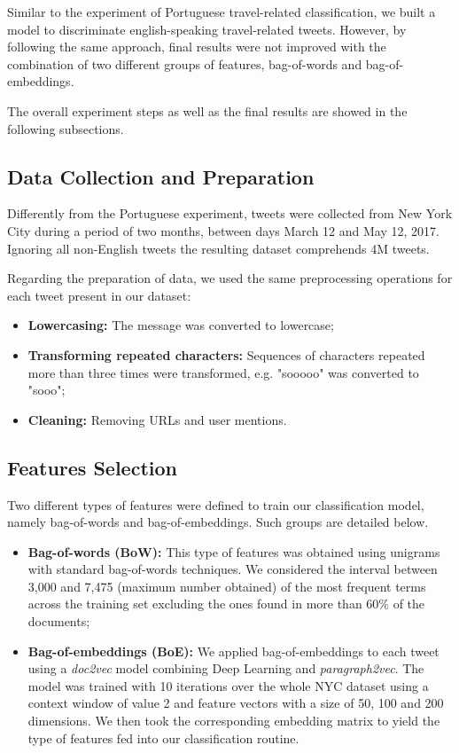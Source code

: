 Similar to the experiment of Portuguese travel-related classification, we built a model to discriminate english-speaking travel-related tweets. However, by following the same approach, final results were not improved with the combination of two different groups of features, bag-of-words and bag-of-embeddings.

The overall experiment steps as well as the final results are showed in the following subsections.

\subsection{Data Collection and Preparation}
Differently from the Portuguese experiment, tweets were collected from New York City during a period of two months, between days March 12 and May 12, 2017. Ignoring all non-English tweets the resulting dataset comprehends 4M tweets.

Regarding the preparation of data, we used the same preprocessing operations for each tweet present in our dataset:

\begin{itemize}
	\item \textbf{Lowercasing:} The message was converted to lowercase;
	\item \textbf{Transforming repeated characters:} Sequences of characters repeated more than three times were transformed, e.g. "sooooo" was converted to "sooo";
	\item \textbf{Cleaning:} Removing URLs and user mentions.
\end{itemize}

\subsection{Features Selection}
Two different types of features were defined to train our classification model, namely bag-of-words and bag-of-embeddings. Such groups are detailed below.

\begin{itemize}
	\item \textbf{Bag-of-words (BoW):} This type of features was obtained using unigrams with standard bag-of-words techniques. We considered the interval between 3,000 and 7,475 (maximum number obtained) of the most frequent terms across the training set excluding the ones found in more than 60$\%$ of the documents;
	
	\item \textbf{Bag-of-embeddings (BoE):} We applied bag-of-embeddings to each tweet using a \textit{doc2vec} model combining Deep Learning and \textit{paragraph2vec}. The model was trained with 10 iterations over the whole NYC dataset using a context window of value 2 and feature vectors with a size of 50, 100 and 200 dimensions. We then took the corresponding embedding matrix to yield the type of features fed into our classification routine.
\end{itemize}

